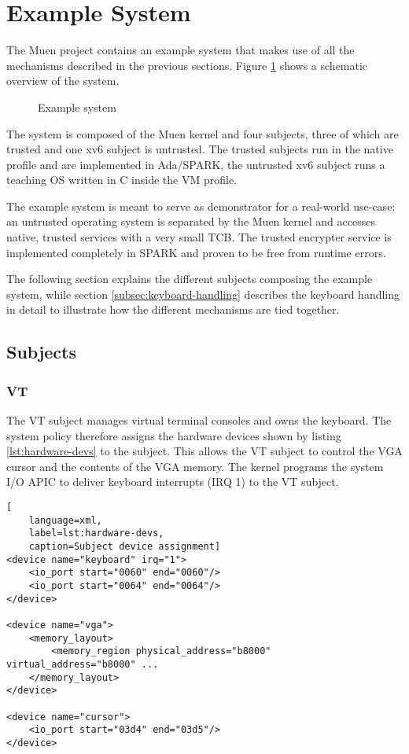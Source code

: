 \section{Example System}\label{sec:example-system}
The Muen project contains an example system that makes use of all the
mechanisms described in the previous sections. Figure \ref{fig:example-system}
shows a schematic overview of the system.

\begin{figure}[h]
	\centering
	
	\caption{Example system}
	\label{fig:example-system}
\end{figure}

The system is composed of the Muen kernel and four subjects, three of which are
trusted and one xv6 subject is untrusted. The trusted subjects run in the native
profile and are implemented in Ada/SPARK, the untrusted xv6 subject runs a
teaching OS written in C inside the VM profile.

The example system is meant to serve as demonstrator for a real-world use-case:
an untrusted operating system is separated by the Muen kernel and accesses
native, trusted services with a very small TCB. The trusted encrypter service is
implemented completely in SPARK and proven to be free from runtime errors.

The following section explains the different subjects composing the example
system, while section \ref{subsec:keyboard-handling} describes the keyboard
handling in detail to illustrate how the different mechanisms are tied
together.

\subsection{Subjects}

\subsubsection{VT}\label{subsubsec:subject-vt}
The VT subject manages virtual terminal consoles and owns the keyboard. The
system policy therefore assigns the hardware devices shown by listing
\ref{lst:hardware-devs} to the subject. This allows the VT subject to control
the VGA cursor and the contents of the VGA memory. The kernel programs the
system I/O APIC to deliver keyboard interrupts (IRQ 1) to the VT subject.

\begin{lstlisting}[
	language=xml,
	label=lst:hardware-devs,
	caption=Subject device assignment]
<device name="keyboard" irq="1">
    <io_port start="0060" end="0060"/>
    <io_port start="0064" end="0064"/>
</device>

<device name="vga">
    <memory_layout>
        <memory_region physical_address="b8000" virtual_address="b8000" ...
    </memory_layout>
</device>

<device name="cursor">
    <io_port start="03d4" end="03d5"/>
</device>
\end{lstlisting}

